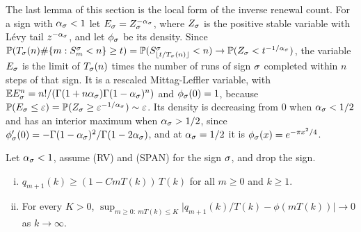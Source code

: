 The last lemma of this section is the local form of the inverse renewal count. For
a sign with $\alpha_\sigma<1$ let $E_\sigma=Z_\sigma^{-\alpha_\sigma}$, where $Z_\sigma$ is the positive
stable variable with L\'evy tail $z^{-\alpha_\sigma}$, and let $\phi_\sigma$ be its density. Since
$\mathbb{P}(T_\sigma(n)\#\{m:S^\sigma_m<n\}\ge t)=\mathbb{P}(S^\sigma_{\lfloor t/T_\sigma(n)\rfloor}<n)\to\mathbb{P}(Z_\sigma<t^{-1/\alpha_\sigma})$,
the variable $E_\sigma$ is the limit of $T_\sigma(n)$ times the number of runs of sign $\sigma$
completed within $n$ steps of that sign. It is a rescaled Mittag-Leffler variable, with
$\mathbb{E} E_\sigma^n=n!/(\Gamma(1+n\alpha_\sigma)\Gamma(1-\alpha_\sigma)^n)$ and $\phi_\sigma(0)=1$, because
$\mathbb{P}(E_\sigma\le\varepsilon)=\mathbb{P}(Z_\sigma\ge\varepsilon^{-1/\alpha_\sigma})\sim\varepsilon$. Its density is
decreasing from $0$ when $\alpha_\sigma<1/2$ and has an interior maximum when $\alpha_\sigma>1/2$,
since $\phi'_\sigma(0)=-\Gamma(1-\alpha_\sigma)^2/\Gamma(1-2\alpha_\sigma)$, and at $\alpha_\sigma=1/2$ it is
$\phi_\sigma(x)=e^{-\pi x^2/4}$.

\begin{lemma}\label{lem:Q}
Let $\alpha_\sigma<1$, assume (RV) and (SPAN) for the sign $\sigma$, and drop the sign.
\begin{enumerate}[(i)]
\item $q_{m+1}(k)\ge(1-CmT(k))\,T(k)$ for all $m\ge0$ and $k\ge1$.
\item For every $K>0$, $\sup_{m\ge0:\ mT(k)\le K}\bigl|q_{m+1}(k)/T(k)-\phi(mT(k))\bigr|\to0$ as $k\to\infty$.
\end{enumerate}
\end{lemma}

